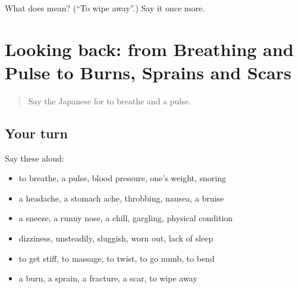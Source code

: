 \begin{tcolorbox}[breakable,colback=teal!4,colframe=teal!35!black,title={Before you move on}]
What does  mean? (\textquotedblleft{}To wipe away\textquotedblright{}.) Say it once more.
\end{tcolorbox}
\section[(dialogue)]{Looking back: from Breathing and Pulse to Burns, Sprains and Scars}

\label{lesson:JA-R449-review-444-449}



\begin{quote}
Say the Japanese for to breathe and a pulse.
\end{quote}

\subsection*{Your turn}
Say these aloud:

\begin{itemize}
\raggedright
  \item to breathe, a pulse, blood pressure, one's weight, snoring
  \item a headache, a stomach ache, throbbing, nausea, a bruise
  \item a sneeze, a runny nose, a chill, gargling, physical condition
  \item dizziness, unsteadily, sluggish, worn out, lack of sleep
  \item to get stiff, to massage, to twist, to go numb, to bend
  \item a burn, a sprain, a fracture, a scar, to wipe away
\end{itemize}

